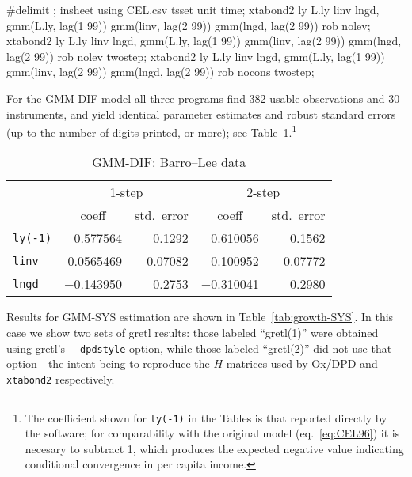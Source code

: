 \begin{script}[htbp]
  \caption{Stata commands for GDP growth example}
  \label{xtabond2-code}
\begin{scode}
#delimit ;
insheet using CEL.csv
tsset unit time;
xtabond2 ly L.ly linv lngd, gmm(L.ly, lag(1 99)) gmm(linv, lag(2 99)) 
  gmm(lngd, lag(2 99)) rob nolev;
xtabond2 ly L.ly linv lngd, gmm(L.ly, lag(1 99)) gmm(linv, lag(2 99)) 
  gmm(lngd, lag(2 99)) rob nolev twostep;
xtabond2 ly L.ly linv lngd, gmm(L.ly, lag(1 99)) gmm(linv, lag(2 99)) 
  gmm(lngd, lag(2 99)) rob nocons twostep;
\end{scode}
\end{script}

For the GMM-DIF model all three programs find 382 usable observations
and 30 instruments, and yield identical parameter estimates and
robust standard errors (up to the number of digits printed, or more);
see Table~\ref{tab:growth-DIF}.\footnote{The coefficient shown for
  \texttt{ly(-1)} in the Tables is that reported directly by the
  software; for comparability with the original model (eq.\
  \ref{eq:CEL96}) it is necesary to subtract 1, which produces the
  expected negative value indicating conditional convergence in per
  capita income.}

\begin{table}[htbp]
\begin{center}
\begin{tabular}{lrrrr}
& \multicolumn{2}{c}{1-step} & \multicolumn{2}{c}{2-step} \\
& \multicolumn{1}{c}{coeff} & \multicolumn{1}{c}{std.\ error} &
  \multicolumn{1}{c}{coeff} & \multicolumn{1}{c}{std.\ error} \\
\texttt{ly(-1)} & 0.577564 & 0.1292 & 0.610056 & 0.1562 \\
\texttt{linv} & 0.0565469 & 0.07082 & 0.100952 & 0.07772 \\
\texttt{lngd} & $-$0.143950 & 0.2753 & $-$0.310041 & 0.2980 \\
\end{tabular}
\caption{GMM-DIF: Barro--Lee data}
\label{tab:growth-DIF}
\end{center}
\end{table}

Results for GMM-SYS estimation are shown in
Table~\ref{tab:growth-SYS}. In this case we show two sets of gretl
results: those labeled ``gretl(1)'' were obtained using gretl's
\verb|--dpdstyle| option, while those labeled ``gretl(2)'' did not use
that option---the intent being to reproduce the $H$ matrices used by
Ox/DPD and \texttt{xtabond2} respectively.

